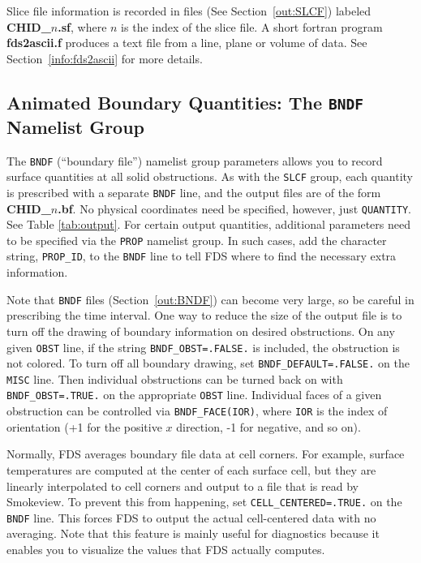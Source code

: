\documentclass[11pt]{book}
\newcommand{\ct}{\tt\small}
\begin{document}
Slice file information is recorded in files (See Section~\ref{out:SLCF})
labeled {\bf CHID\_$n$.sf}, where $n$ is the index of the slice file.
A short fortran program {\bf fds2ascii.f} produces a text file from a line,
plane or volume of data. See Section~\ref{info:fds2ascii} for more details.






\subsection{Animated Boundary Quantities: The \texorpdfstring{{\tt BNDF}}{BNDF} Namelist Group}
\label{info:BNDF}

The {\ct BNDF} (``boundary file'') namelist group parameters allows you
to record surface quantities at all solid obstructions. As with
the {\ct SLCF} group, each quantity is prescribed with a separate
{\ct BNDF} line, and the output files are of the form {\bf CHID\_$n$.bf}.
No physical coordinates need be specified, however, just {\ct QUANTITY}.
See Table \ref{tab:output}. For certain output quantities, additional parameters need to be specified via
the {\ct PROP} namelist group. In such cases, add the character string, {\ct PROP\_ID}, to the {\ct BNDF} line
to tell FDS where to find the necessary extra information.

Note that {\ct BNDF} files (Section~\ref{out:BNDF}) can become very
large, so be careful in prescribing the time interval.
One way to reduce the size of the output file is to turn off the
drawing of boundary information on desired obstructions. On any given
{\ct OBST} line, if the string {\ct BNDF\_OBST=.FALSE.} is included,
the obstruction is not colored. To turn off all boundary drawing,
set {\ct BNDF\_DEFAULT=.FALSE.} on the {\ct MISC} line. Then individual
obstructions can be turned back on with {\ct BNDF\_OBST=.TRUE.} on
the appropriate {\ct OBST} line. Individual faces of a given obstruction can be controlled
via {\ct BNDF\_FACE(IOR)}, where {\ct IOR} is the index of orientation (+1 for the positive $x$ direction, -1 for negative, and so on).

Normally, FDS averages boundary file data at cell corners. For example, surface temperatures are computed at the center of each surface cell, but they
are linearly interpolated to cell corners and output to a file that is read by Smokeview. To prevent this from happening,
set {\ct CELL\_CENTERED=.TRUE.} on the {\ct BNDF} line. This forces FDS to output the actual cell-centered data with no averaging. Note that this
feature is mainly useful for diagnostics because it enables you to visualize the values that FDS actually computes.
\end{document}
